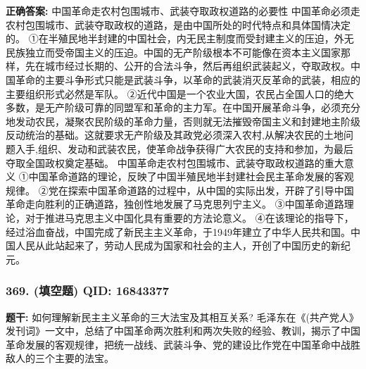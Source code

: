 \documentclass[12pt,UTF8]{ctexart}
\begin{document}
\textbf{正确答案:}
中国革命走农村包围城市、武装夺取政权道路的必要性
中国革命必须走农村包围城市、武装夺取政权的道路，是由中国所处的时代特点和具体国情决定的。
①在半殖民地半封建的中国社会，内无民主制度而受封建主义的压迫，外无民族独立而受帝国主义的压迫。中国的无产阶级根本不可能像在资本主义国家那样，先在城市经过长期的、公开的合法斗争，然后再组织武装起义，夺取政权。中国革命的主要斗争形式只能是武装斗争，以革命的武装消灭反革命的武装，相应的主要组织形式必然是军队。
②近代中国是一个农业大国，农民占全国人口的绝大多数，是无产阶级可靠的同盟军和革命的主力军。在中国开展革命斗争，必须充分地发动农民，凝聚农民阶级的革命力量，否则就无法摧毁帝国主义和封建地主阶级反动统治的基础。这就要求无产阶级及其政党必须深入农村,从解决农民的土地问题入手,组织、发动和武装农民，使革命战争获得广大农民的支持和参加，为最后夺取全国政权奠定基础。
中国革命走农村包围城市、武装夺取政权道路的重大意义
①中国革命道路的理论，反映了中国半殖民地半封建社会民主革命发展的客观规律。
②党在探索中国革命道路的过程中，从中国的实际出发，开辟了引导中国革命走向胜利的正确道路，独创性地发展了马克思列宁主义。
③中国革命道路理论，对于推进马克思主义中国化具有重要的方法论意义。
④在该理论的指导下，经过浴血奋战，中国完成了新民主主义革命，于1949年建立了中华人民共和国。中国人民从此站起来了，劳动人民成为国家和社会的主人，开创了中国历史的新纪元。

\vspace{0.3em}\hrulefill\vspace{0.7em}

\subsubsection*{369. (填空题) \small QID: 16843377}

\textbf{题干:}
如何理解新民主主义革命的三大法宝及其相互关系?
毛泽东在《(共产党人》发刊词》一文中，总结了中国革命两次胜利和两次失败的经验、教训，揭示了中国革命发展的客观规律，把统一战线、武装斗争、党的建设比作党在中国革命中战胜敌人的三个主要的法宝。
\end{document}
